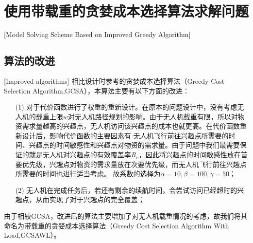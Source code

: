 
\chapter{使用带载重的贪婪成本选择算法求解问题}[Model Solving Scheme Based on Improved Greedy Algorithm]

\section{算法的改进}[Improved algorithms]
相比设计时参考的贪婪成本选择算法（Greedy Cost Selection Algorithm,GCSA），本算法主要有以下方面的改进：
\begin{itemize}
	\item [(1)] 对于代价函数进行了权重的重新设计。在原本的问题设计中，没有考虑无人机的载重上限$w$对无人机路径规划的影响。由于无人机载重有限，所以对物资需求量越高的兴趣点，无人机访问该兴趣点的成本也就更高。在代价函数重新设计后，影响代价函数的主要因素有
无人机飞行前往兴趣点所需要的时间、兴趣点的时间敏感性和兴趣点对物资的需求量。由于问题中我们最需要保证的就是无人机对兴趣点的有效覆盖率$R_e$，因此将兴趣点的时间敏感性放在首要优先级，兴趣点对物资的需求量放在次要优先级，而无人机飞行前往兴趣点所需要的时间也进行适当考虑。
故系数的选择为$\alpha = 10,\beta = 100,\gamma = 50$；
	\item [(2)] 无人机在完成任务后，若还有剩余的续航时间，会尝试访问已经超时的兴趣点，从而实现了对于兴趣点的完全覆盖；
\end{itemize}


由于相较GCSA，改进后的算法主要增加了对无人机载重情况的考虑，故我们将其命名为带载重的贪婪成本选择算法（Greedy Cost Selection Algorithm With Load,GCSAWL）。
